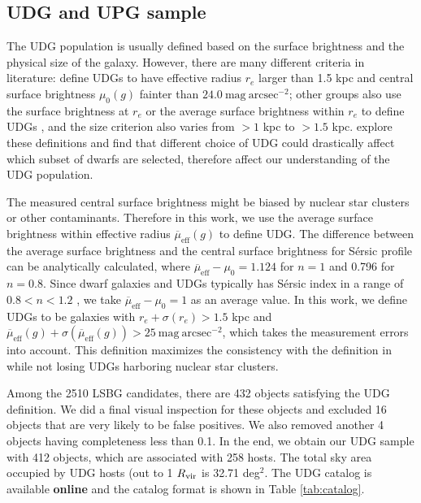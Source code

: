 \documentclass[twocolumn,astrosymb,twocolappendix]{aastex631}
\newcommand{\sbunit}{\mathrm{mag\ arcsec}^{-2}}
\newcommand{\sbeff}{\overline{\mu}_{\mathrm{eff}}(g)}
\newcommand{\sersic}{S\'ersic}
\begin{document}
\begin{CJK*}{UTF8}{gbsn}
\subsection{UDG and UPG sample}\label{sec:sample}
The UDG population is usually defined based on the surface brightness and the physical size of the galaxy. However, there are many different criteria in literature: \citep{vanDokkum2015} define UDGs to have effective radius $r_e$ larger than 1.5 kpc and central surface brightness $\mu_0(g)$ fainter than $24.0\ \sbunit$; other groups also use the surface brightness at $r_e$ \citep[e.g.,][]{DiCintio2017,Cardona-Barrero2020} or the average surface brightness within $r_e$ to define UDGs \citep[e.g.,][]{Koda2015,Yagi2016,vdBurg2016,Leisman2017,Martin2019}, and the size criterion also varies from $>1$ kpc to $>1.5$ kpc. \citet{vanNest2022} explore these definitions and find that different choice of UDG could drastically affect which subset of dwarfs are selected, therefore affect our understanding of the UDG population.

The measured central surface brightness might be biased by nuclear star clusters \citep{Neumayer2020} or other contaminants. Therefore in this work, we use the average surface brightness within effective radius $\sbeff$ to define UDG. The difference between the average surface brightness and the central surface brightness for \sersic{} profile can be analytically calculated, where $\overline{\mu}_{\mathrm{eff}} - \mu_0 = 1.124$ for $n=1$ and 0.796 for $n=0.8$. Since dwarf galaxies and UDGs typically has \sersic{} index in a range of $0.8 < n < 1.2$ \citep{vanDokkum2015,ELVES-I}, we take $\overline{\mu}_{\mathrm{eff}} - \mu_0 = 1$ as an average value. In this work, we define UDGs to be galaxies with $r_e+\sigma(r_e) > 1.5$ kpc and $\sbeff + \sigma(\sbeff) > 25\ \sbunit$, which takes the measurement errors into account. This definition maximizes the consistency with the definition in \citet{vanDokkum2015} while not losing UDGs harboring nuclear star clusters.

Among the 2510 LSBG candidates, there are 432 objects satisfying the UDG definition. We did a final visual inspection for these objects and excluded 16 objects that are very likely to be false positives. We also removed another 4 objects having completeness less than 0.1. In the end, we obtain our UDG sample with 412 objects, which are associated with 258 hosts. The total sky area occupied by UDG hosts (out to 1 $R_{\rm{vir}}$ is 32.71 deg$^{2}$. The UDG catalog is available \textbf{online} and the catalog format is shown in Table \ref{tab:catalog}. 


\end{CJK*}
\end{document}
